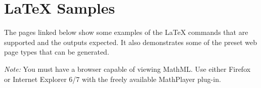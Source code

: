 
\section*{LaTeX Samples}

The pages linked below show some examples of the LaTeX commands that are supported
and the outputs expected. It also demonstrates some of the preset web page types that
can be generated.

\emph{Note:} You must have a browser capable of viewing MathML. Use
either Firefox or Internet Explorer 6/7 with the freely available MathPlayer plug-in.

